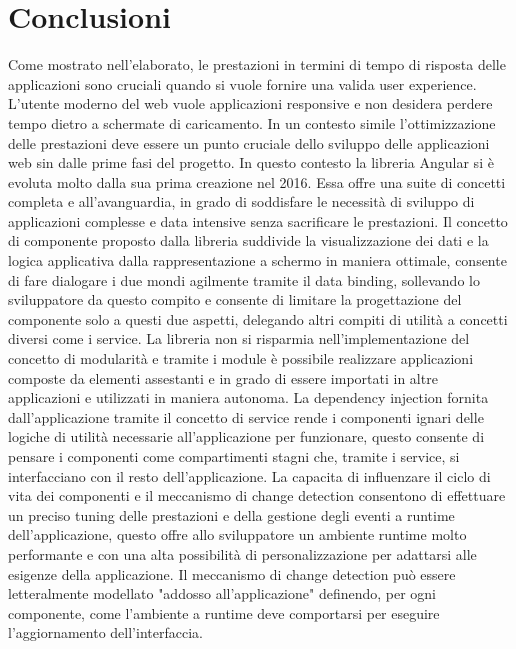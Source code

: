 \chapter*{Conclusioni}

Come mostrato nell'elaborato, le prestazioni in termini di tempo di risposta delle applicazioni sono cruciali quando si vuole fornire una valida user experience. L'utente moderno del web vuole applicazioni responsive e non desidera perdere tempo dietro a schermate di caricamento. In un contesto simile l'ottimizzazione delle prestazioni deve essere un punto cruciale dello sviluppo delle applicazioni web sin dalle prime fasi del progetto.
\newline
In questo contesto la libreria Angular si è evoluta molto dalla sua prima creazione nel 2016. Essa offre una suite di concetti completa e all'avanguardia, in grado di soddisfare le necessità di sviluppo di applicazioni complesse e data intensive senza sacrificare le prestazioni.
\newline
Il concetto di componente proposto dalla libreria suddivide la visualizzazione dei dati e la logica applicativa dalla rappresentazione a schermo in maniera ottimale, consente di fare dialogare i due mondi agilmente tramite il data binding, sollevando lo sviluppatore da questo compito e consente di limitare la progettazione del componente solo a questi due aspetti, delegando altri compiti di utilità a concetti diversi come i service.
\newline 
La libreria non si risparmia nell'implementazione del concetto di modularità e tramite i module è possibile realizzare applicazioni composte da elementi assestanti e in grado di essere importati in altre applicazioni e utilizzati in maniera autonoma.
\newline
La dependency injection fornita dall'applicazione tramite il concetto di service rende i componenti ignari delle logiche di utilità necessarie all'applicazione per funzionare, questo consente di pensare i componenti come compartimenti stagni che, tramite i service, si interfacciano con il resto dell'applicazione.
\newline 
La capacita di influenzare il ciclo di vita dei componenti e il meccanismo di change detection consentono di effettuare un preciso tuning delle prestazioni e della gestione degli eventi a runtime dell'applicazione, questo offre allo sviluppatore un ambiente runtime molto performante e con una alta possibilità di personalizzazione per adattarsi alle esigenze della applicazione. Il meccanismo di change detection può essere letteralmente modellato "addosso all'applicazione" definendo, per ogni componente, come l'ambiente a runtime deve comportarsi per eseguire l'aggiornamento dell'interfaccia.
